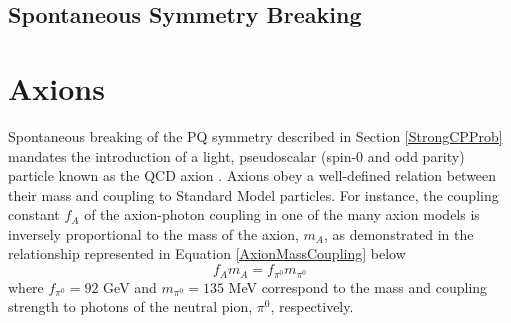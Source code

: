 \subsection{Spontaneous Symmetry Breaking}
\section{Axions}
Spontaneous breaking of the PQ symmetry described in Section \ref{StrongCPProb} mandates the introduction of a light, pseudoscalar (spin-0 and odd parity) particle known as the QCD axion \cite{article}. Axions obey a well-defined relation between their mass and coupling
to Standard Model particles. For instance, the coupling constant $f_{A}$ of the axion-photon coupling in one of the many axion models is inversely proportional to the mass of the axion, $m_{A}$, as demonstrated in the relationship represented in Equation \ref{AxionMassCoupling} below
\begin{equation}\label{AxionMassCoupling}
    f_{A}m_{A} = f_{\pi^{0}}m_{\pi^{0}}
\end{equation}
where $f_{\pi^{0}} = 92$ GeV and $m_{\pi^{0}} = 135$ MeV correspond to the mass and coupling strength to photons of the neutral pion, $\pi^{0}$, respectively.
